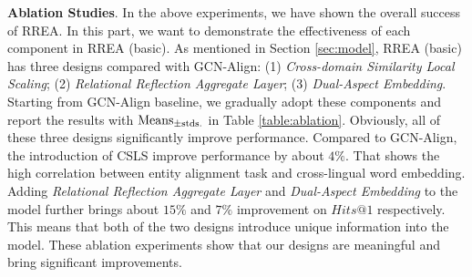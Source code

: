\documentclass[sigconf,camera-ready]{acmart}
\begin{document}
\begin{table}[t]
\renewcommand\arraystretch{1.5}
\centering
{}
\caption{Ablation experiment of RREA (basic) on DBP15K.}
\label{table:ablation}
\end{table}

\noindent
\textbf{Ablation Studies}.
In the above experiments, we have shown the overall success of RREA.
In this part, we want to demonstrate the effectiveness of each component in RREA (basic).
As mentioned in Section \ref{sec:model}, RREA (basic) has three designs compared with GCN-Align: (1) \emph{Cross-domain Similarity Local Scaling}; (2) \emph{Relational Reflection Aggregate Layer}; (3) \emph{Dual-Aspect Embedding}.
Starting from GCN-Align baseline, we gradually adopt these components and report the results with ${\rm Means}_{\pm {\rm stds.}}$ in Table \ref{table:ablation}.
Obviously, all of these three designs significantly improve performance.
Compared to GCN-Align, the introduction of CSLS improve performance by about $4\%$.
That shows the high correlation between entity alignment task and cross-lingual word embedding.
Adding \emph{Relational Reflection Aggregate Layer} and \emph{Dual-Aspect Embedding} to the model further brings about $15\%$ and $7\%$ improvement on $Hits@1$ respectively.
This means that both of the two designs introduce unique information into the model.
These ablation experiments show that our designs are meaningful and bring significant improvements.
\end{document}
